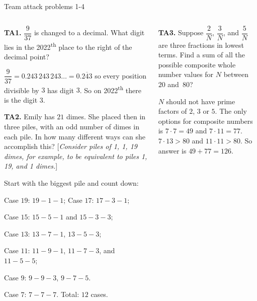 \documentclass[9pt,aspectratio=169,handout]{beamer}
\begin{document}
\begin{frame}{Team attack problems 1-4}
  \begin{columns}[T]
    \begin{column}{0.5\textwidth}
      \vspace*{-0.5\intextsep}
      \begin{problem}
        \textbf{TA1.} $\dfrac{9}{37}$ is changed to a decimal. What digit lies in the 2022\textsuperscript{th} place to the right of the decimal point?
      \end{problem}\pause
      $\dfrac{9}{37} = 0.243\,243\,243\ldots = 0.\overline{243}$ so every position divisible by $3$ has digit $3$. So on 2022\textsuperscript{th} there is the digit $\boxed{3}$.\pause

      \begin{problem}
        \textbf{TA2.} Emily has $21$ dimes. She placed then in three piles, with an odd number of dimes in each pile. In how many different ways can she accomplish this? [\emph{Consider piles of 1, 1, 19 dimes, for example, to be equivalent to piles 1, 19, and 1 dimes.}]
      \end{problem}\pause
      Start with the biggest pile and count down:
      
      Case $19$: $19-1-1$;
      Case $17$: $17-3-1$;

      Case $15$: $15-5-1$ and $15-3-3$;

      Case $13$: $13-7-1$, $13-5-3$;

      Case $11$: $11-9-1$, $11-7-3$, and $11-5-5$;

      Case $9$: $9-9-3$, $9-7-5$.

      Case $7$: $7-7-7$.
      Total: $\boxed{12}$ cases.\pause
    \end{column}
    \begin{column}{0.5\textwidth}
      \vspace*{-0.5\intextsep}
      \begin{problem}
        \textbf{TA3.} Suppose $\dfrac{2}{N}$, $\dfrac{3}{N}$, and $\dfrac{5}{N}$ are three fractions in lowest terms. Find a sum of all the possible composite whole number values for $N$ between $20$ and~$80$?
      \end{problem}\pause
      $N$ should not have prime factors of $2$, $3$ or $5$. The only options for composite numbers is $7 \cdot 7=49$ and $7 \cdot 11=77$. $7 \cdot 13 > 80$ and $11 \cdot 11 > 80$. So answer is $49 + 77 = \boxed{126}$.\pause


\end{column}
\end{columns}
\end{frame}
\end{document}
